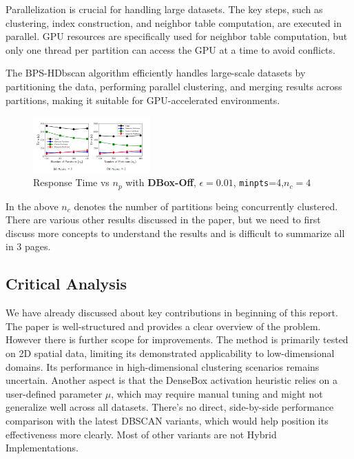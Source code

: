 \documentclass{article}
\begin{document}
Parallelization is crucial for handling large datasets. The key steps, such as clustering, index construction, and neighbor table computation, are executed in parallel. GPU resources are specifically used for neighbor table computation, but only one thread per partition can access the GPU at a time to avoid conflicts.

The BPS-HDbscan algorithm efficiently handles large-scale datasets by partitioning the data, performing parallel clustering, and merging results across partitions, making it suitable for GPU-accelerated environments.

\begin{figure}[h]
    \centering
    \includegraphics[width=0.4\textwidth]{result1.png}
    \caption{Response Time vs $n_p$ with \textbf{DBox-Off}, $\epsilon=0.01$, \texttt{minpts}=4,$n_c=4$}
    \label{fig:algorithm_overview}
\end{figure}
In the above $n_c$ denotes the number of partitions being concurrently clustered. There are various other results discussed in the paper, but we need to first discuss more concepts to understand the results and is difficult to summarize all in 3 pages.

\subsection*{Critical Analysis}
We have already discussed about key contributions in beginning of this report. The paper is well-structured and provides a clear overview of the problem. However there is further scope for improvements. The method is primarily tested on 2D spatial data, limiting its demonstrated applicability to low-dimensional domains. Its performance in high-dimensional clustering scenarios remains uncertain. Another aspect is that the DenseBox activation heuristic relies on a user-defined parameter $\mu$, which may require manual tuning and might not generalize well across all datasets. There's no direct, side-by-side performance comparison with the latest DBSCAN variants, which would help position its effectiveness more clearly. Most of other variants are not Hybrid Implementations.
\end{document}
